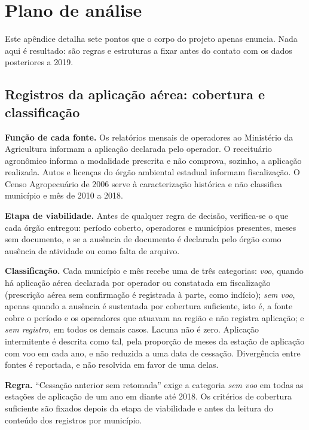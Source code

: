 \chapter{Plano de análise}
\label{ap:plano}

Este apêndice detalha sete pontos que o corpo do projeto apenas enuncia. Nada
aqui é resultado: são regras e estruturas a fixar antes do contato com os dados
posteriores a 2019.

\section{Registros da aplicação aérea: cobertura e classificação}

\textbf{Função de cada fonte.} Os relatórios mensais de operadores ao
Ministério da Agricultura informam a aplicação declarada pelo operador. O
receituário agronômico informa a modalidade prescrita e não comprova, sozinho, a
aplicação realizada. Autos e licenças do órgão ambiental estadual informam
fiscalização. O Censo Agropecuário de 2006 serve à caracterização histórica e
não classifica município e mês de 2010 a 2018.

\textbf{Etapa de viabilidade.} Antes de qualquer regra de decisão, verifica-se o
que cada órgão entregou: período coberto, operadores e municípios presentes,
meses sem documento, e se a ausência de documento é declarada pelo órgão como
ausência de atividade ou como falta de arquivo.

\textbf{Classificação.} Cada município e mês recebe uma de três categorias:
\emph{voo}, quando há aplicação aérea declarada por operador ou constatada em
fiscalização (prescrição aérea sem confirmação é registrada à parte, como
indício);
\emph{sem voo}, apenas quando a ausência é sustentada por cobertura suficiente,
isto é, a fonte cobre o período e os operadores que atuavam na região e não
registra aplicação; e \emph{sem registro}, em todos os demais casos. Lacuna não
é zero. Aplicação intermitente é descrita como tal, pela proporção de meses da
estação de aplicação com voo em cada ano, e não reduzida a uma data de
cessação. Divergência entre fontes é reportada, e não resolvida em favor de uma
delas.

\textbf{Regra.} ``Cessação anterior sem retomada'' exige a categoria \emph{sem
voo} em todas as estações de aplicação de um ano em diante até 2018. Os
critérios de cobertura suficiente são fixados depois da etapa de viabilidade e
antes da leitura do conteúdo dos registros por município.

